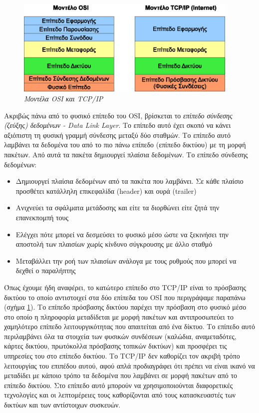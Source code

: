 \begin{figure}[!ht]
  \centering
  \includegraphics[width=0.95\textwidth]{images/chapter2/2-1}
  \caption {\textsl{Μοντέλα OSI και TCP/IP}}
  \label{2-1}
\end{figure}

Ακριβώς πάνω από το φυσικό επίπεδο του OSI, βρίσκεται το \emph{επίπεδο σύνδεσης (ζεύξης) δεδομένων - Data Link Layer}. Το επίπεδο αυτό έχει σκοπό να κάνει αξιόπιστη τη φυσική γραμμή σύνδεσης μεταξύ δύο σταθμών. Το επίπεδο αυτό λαμβάνει τα δεδομένα του από το πιο πάνω επίπεδο (επίπεδο δικτύου) με τη μορφή πακέτων. Από αυτά τα πακέτα δημιουργεί πλαίσια δεδομένων.  Το επίπεδο σύνδεσης δεδομένων:

\begin{itemize}
\item Δημιουργεί πλαίσια δεδομένων από τα πακέτα που λαμβάνει. Σε κάθε πλαίσιο προσθέτει κατάλληλη επικεφαλίδα (header) και ουρά (trailer)
\item Ανιχνεύει τα σφάλματα μετάδοσης και είτε τα διορθώνει είτε ζητά την επανεκπομπή τους
\item Ελέγχει πότε μπορεί να δεσμεύσει το φυσικό μέσο ώστε να ξεκινήσει την αποστολή των πλαισίων χωρίς κίνδυνο σύγκρουσης με άλλο σταθμό
\item Μεταβάλλει την ροή των πλαισίων ανάλογα με τους ρυθμούς που μπορεί να δεχθεί ο παραλήπτης
\end{itemize}

Όπως έχουμε ήδη αναφέρει, το κατώτερο επίπεδο στο TCP/IP είναι το πρόσβασης δικτύου το οποίο αντιστοιχεί στα δύο επίπεδα του OSI που περιγράψαμε παραπάνω (σχήμα \ref{2-1}). Το επίπεδο πρόσβασης δικτύου παρέχει την πρόσβαση στο φυσικό μέσο στο οποίο η πληροφορία μεταδίδεται με μορφή πακέτων και αντιπροσωπεύει το χαμηλότερο επίπεδο λειτουργικότητας που απαιτείται από ένα δίκτυο. Το επίπεδο αυτό περιλαμβάνει όλα τα στοιχεία των φυσικών συνδέσεων (καλώδια, αναμεταδότες, κάρτες δικτύου, πρωτόκολλα πρόσβασης τοπικών δικτύων) και προσφέρει τις υπηρεσίες του στο επίπεδο δικτύου. Το TCP/IP δεν καθορίζει τον ακριβή τρόπο λειτουργίας του επιπέδου αυτού, αφού απλά προδιαγράφει ότι πρέπει να είναι ικανό να μεταδίδει με κάποιο τρόπο τα δεδομένα που λαμβάνει σε μορφή πακέτων από το επίπεδο δικτύου. Στο επίπεδο αυτό μπορούν να χρησιμοποιούνται διαφορετικές τεχνολογίες και οι λεπτομέρειες τους καθορίζονται από τους κατασκευαστές των δικτύων και των αντίστοιχων συσκευών.